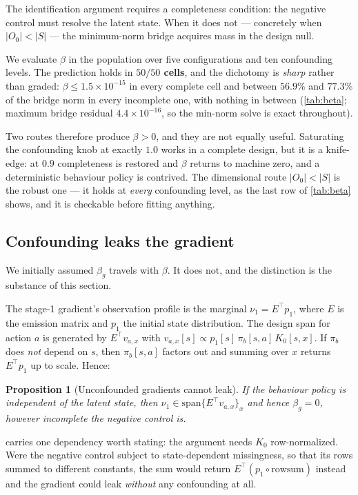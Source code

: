 \documentclass{article}
\theoremstyle{plain}
\newtheorem{proposition}{Proposition}
\theoremstyle{definition}
\begin{document}
The identification argument requires a completeness condition: the negative
control must resolve the latent state. When it does not --- concretely when
$|O_0| < |S|$ --- the minimum-norm bridge acquires mass in the design null.

We evaluate $\beta$ in the population over five configurations and ten
confounding levels. The prediction holds in \textbf{$50/50$ cells}, and the
dichotomy is \emph{sharp} rather than graded: $\beta \le 1.5\times10^{-15}$ in
every complete cell and between $56.9\%$ and $77.3\%$ of the bridge norm in every
incomplete one, with nothing in between (\cref{tab:beta}; maximum bridge residual
$4.4\times10^{-16}$, so the min-norm solve is exact throughout).

Two routes therefore produce $\beta>0$, and they are not equally useful.
Saturating the confounding knob at exactly $1.0$ works in a complete design, but
it is a knife-edge: at $0.9$ completeness is restored and $\beta$ returns to
machine zero, and a deterministic behaviour policy is contrived. The dimensional
route $|O_0|<|S|$ is the robust one --- it holds at \emph{every} confounding
level, as the last row of \cref{tab:beta} shows, and it is checkable before
fitting anything.

\subsection{Confounding leaks the gradient}
\label{sec:switch-betag}

We initially assumed $\beta_g$ travels with $\beta$. It does not, and the
distinction is the substance of this section.

The stage-1 gradient's observation profile is the marginal $\nu_1 = E^\top p_1$,
where $E$ is the emission matrix and $p_1$ the initial state distribution. The
design span for action $a$ is generated by $E^\top v_{a,x}$ with
$v_{a,x}[s] \propto p_1[s]\,\pi_b[s,a]\,K_0[s,x]$. If $\pi_b$ does \emph{not}
depend on $s$, then $\pi_b[s,a]$ factors out and summing over $x$ returns
$E^\top p_1$ up to scale. Hence:

\begin{proposition}[Unconfounded gradients cannot leak]
\label{prop:betag}
If the behaviour policy is independent of the latent state, then
$\nu_1 \in \mathrm{span}\{E^\top v_{a,x}\}_x$ and hence $\beta_g = 0$, however
incomplete the negative control is.
\end{proposition}

 carries one dependency worth stating: the argument needs $K_0$
row-normalized. Were the negative control subject to state-dependent missingness,
so that its rows summed to different constants, the sum would return
$E^\top(p_1 \circ \mathrm{rowsum})$ instead and the gradient could leak
\emph{without} any confounding at all.
\end{document}
